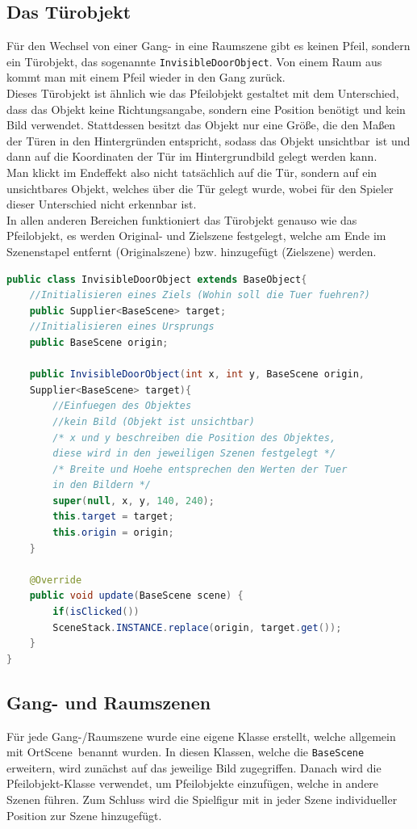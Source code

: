 \subsection{Das Türobjekt}
Für den Wechsel von einer Gang- in eine Raumszene gibt es keinen Pfeil, sondern ein Türobjekt, das sogenannte \texttt{InvisibleDoorObject}. Von einem Raum aus kommt man mit einem Pfeil wieder in den Gang zurück. \\
Dieses Türobjekt ist ähnlich wie das Pfeilobjekt gestaltet mit dem Unterschied, dass das Objekt keine Richtungsangabe, sondern eine Position benötigt und kein Bild verwendet. Stattdessen besitzt das Objekt nur eine Größe, die den Maßen der Türen in den Hintergründen entspricht, sodass das Objekt \glqq unsichtbar\grqq\ ist und dann auf die Koordinaten der Tür im Hintergrundbild gelegt werden kann. \\
Man klickt im Endeffekt also nicht tatsächlich auf die Tür, sondern auf ein unsichtbares Objekt, welches über die Tür gelegt wurde, wobei für den Spieler dieser Unterschied nicht erkennbar ist. \\
In allen anderen Bereichen funktioniert das Türobjekt genauso wie das Pfeilobjekt, es werden Original- und Zielszene festgelegt, welche am Ende im Szenenstapel entfernt (Originalszene) bzw. hinzugefügt (Zielszene) werden.

\begin{lstlisting}[caption=TürObject, label=lst:pfeilobject, captionpos=p, language=Java]
public class InvisibleDoorObject extends BaseObject{
	//Initialisieren eines Ziels (Wohin soll die Tuer fuehren?)
	public Supplier<BaseScene> target;
	//Initialisieren eines Ursprungs
	public BaseScene origin;
		
	public InvisibleDoorObject(int x, int y, BaseScene origin, 
	Supplier<BaseScene> target){
		//Einfuegen des Objektes
		//kein Bild (Objekt ist unsichtbar)
		/* x und y beschreiben die Position des Objektes, 
		diese wird in den jeweiligen Szenen festgelegt */
		/* Breite und Hoehe entsprechen den Werten der Tuer 
		in den Bildern */
		super(null, x, y, 140, 240);
		this.target = target;
		this.origin = origin;
	}
		
	@Override
	public void update(BaseScene scene) {
		if(isClicked())
		SceneStack.INSTANCE.replace(origin, target.get());
	}
}
\end{lstlisting}

\subsection{Gang- und Raumszenen}
Für jede Gang-/Raumszene wurde eine eigene Klasse erstellt, welche allgemein mit \glqq OrtScene\grqq\ benannt wurden. In diesen Klassen, welche die \texttt{BaseScene} erweitern, wird zunächst auf das jeweilige Bild zugegriffen. Danach wird die Pfeilobjekt-Klasse verwendet, um Pfeilobjekte einzufügen, welche in andere Szenen führen. Zum Schluss wird die Spielfigur mit in jeder Szene individueller Position zur Szene hinzugefügt.

